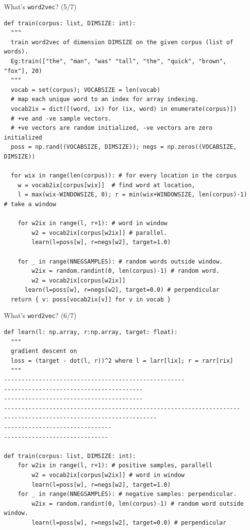 \documentclass[8pt]{beamer}
\begin{document}
\begin{frame}[fragile]{What's \texttt{word2vec}? (5/7)}
\begin{verbatim}
def train(corpus: list, DIMSIZE: int):
  """
  train word2vec of dimension DIMSIZE on the given corpus (list of words).
  Eg:train(["the", "man", "was" "tall", "the", "quick", "brown", "fox"], 20)
  """
  vocab = set(corpus); VOCABSIZE = len(vocab)
  # map each unique word to an index for array indexing.
  vocab2ix = dict([(word, ix) for (ix, word) in enumerate(corpus)])
  # +ve and -ve sample vectors.
  # +ve vectors are random initialized, -ve vectors are zero initialized
  poss = np.rand((VOCABSIZE, DIMSIZE)); negs = np.zeros((VOCABSIZE, DIMSIZE))

  for wix in range(len(corpus)): # for every location in the corpus
    w = vocab2ix[corpus[wix]]  # find word at location,
    l = max(wix-WINDOWSIZE, 0); r = min(wix+WINDOWSIZE, len(corpus)-1) # take a window

    for w2ix in range(l, r+1): # word in window
        w2 = vocab2ix[corpus[w2ix]] # parallel.
        learn(l=poss[w], r=negs[w2], target=1.0)

    for _ in range(NNEGSAMPLES): # random words outside window. 
        w2ix = random.randint(0, len(corpus)-1) # random word.
        w2 = vocab2ix[corpus[w2ix]] 
      learn(l=poss[w], r=negs[w2], target=0.0) # perpendicular
  return { v: poss[vocab2ix[v]] for v in vocab } 
\end{verbatim}
\end{frame}

\begin{frame}[fragile]{What's \texttt{word2vec}? (6/7)}
\begin{verbatim}
def learn(l: np.array, r:np.array, target: float):
  """
  gradient descent on
  loss = (target - dot(l, r))^2 where l = larr[lix]; r = rarr[rix]
  """
----------------------------------------------------
----------------------------------------
----------------------------------------
--------------------------------------------------------------------
--------------------------------------------
-------------------------------
------------------------------

def train(corpus: list, DIMSIZE: int):
    for w2ix in range(l, r+1): # positive samples, parallell
        w2 = vocab2ix[corpus[w2ix]] # word in window
        learn(l=poss[w], r=negs[w2], target=1.0)
    for _ in range(NNEGSAMPLES): # negative samples: perpendicular. 
        w2ix = random.randint(0, len(corpus)-1) # random word outside window.
        learn(l=poss[w], r=negs[w2], target=0.0) # perpendicular
\end{verbatim}
\end{frame}
\end{document}
